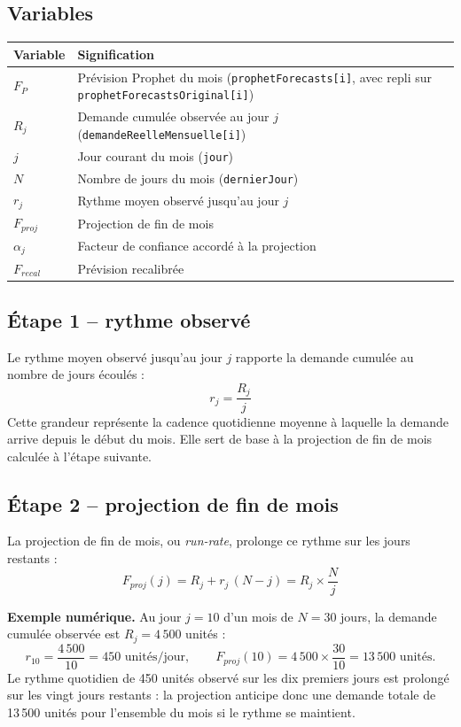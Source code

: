 \documentclass[11pt,a4paper]{article}
\newcommand{\code}[1]{\texttt{#1}}
\begin{document}
\subsection{Variables}

\begin{center}
\small
\begin{tabularx}{0.92\textwidth}{lX}
\toprule
Variable & Signification \\
\midrule
\(F_P\) & Prévision Prophet du mois (\code{prophetForecasts[i]}, avec repli sur \code{prophetForecastsOriginal[i]}) \\
\(R_j\) & Demande cumulée observée au jour \(j\) (\code{demandeReelleMensuelle[i]}) \\
\(j\) & Jour courant du mois (\code{jour}) \\
\(N\) & Nombre de jours du mois (\code{dernierJour}) \\
\(r_j\) & Rythme moyen observé jusqu'au jour \(j\) \\
\(F_{proj}\) & Projection de fin de mois \\
\(\alpha_j\) & Facteur de confiance accordé à la projection \\
\(F_{recal}\) & Prévision recalibrée \\
\bottomrule
\end{tabularx}
\end{center}

\subsection{Étape 1 -- rythme observé}

Le rythme moyen observé jusqu'au jour \(j\) rapporte la demande cumulée au nombre de jours écoulés :
\[
r_j = \frac{R_j}{j}
\]
Cette grandeur représente la cadence quotidienne moyenne à laquelle la demande arrive depuis le début du mois. Elle sert de base à la projection de fin de mois calculée à l'étape suivante.

\subsection{Étape 2 -- projection de fin de mois}

La projection de fin de mois, ou \emph{run-rate}, prolonge ce rythme sur les jours restants :
\[
F_{proj}(j) = R_j + r_j\,(N-j) = R_j\times\frac{N}{j}
\]

\textbf{Exemple numérique.} Au jour \(j=10\) d'un mois de \(N=30\) jours, la demande cumulée observée est \(R_j=4\,500\) unités :
\[
r_{10} = \frac{4\,500}{10} = 450 \text{ unités/jour}, \qquad
F_{proj}(10) = 4\,500 \times \frac{30}{10} = 13\,500 \text{ unités.}
\]
Le rythme quotidien de 450 unités observé sur les dix premiers jours est prolongé sur les vingt jours restants : la projection anticipe donc une demande totale de 13\,500 unités pour l'ensemble du mois si le rythme se maintient.
\end{document}

